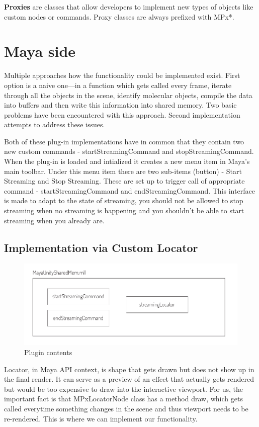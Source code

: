 \documentclass[
  digital, %
  table,   %
  nolof,     %
  nolot,     %
]{fithesis3}
\begin{document}
\textbf{Proxies} are classes that allow developers to implement new types of objects like custom nodes or commands. Proxy classes are always prefixed with MPx*.

\section{Maya side}
Multiple approaches how the functionality could be implemented exist. First option is a naive one—in a function which gets called every frame, iterate through all the objects in the scene, identify molecular objects, compile the data into buffers and then write this information into shared memory. Two basic problems have been encountered with this approach. Second implementation attempts to address these issues.

Both of these plug-in implementations have in common that they contain two new custom commands - startStreamingCommand and stopStreamingCommand. When the plug-in is loaded and intialized it creates a new menu item in Maya's main toolbar. Under this menu item there are two sub-items (button) - Start Streaming and Stop Streaming. These are set up to trigger call of appropriate command - startStreamingCommand and endStreamingCommand. This interface is made to adapt to the state of streaming, you should not be allowed to stop streaming when no streaming is happening and you shouldn't be able to start streaming when you already are.

\subsection{Implementation via Custom Locator}
\begin{figure}
  \centering
  \includegraphics[scale=0.8]{images/plugin-contents.pdf}
  \caption{Plugin contents}
  \label{fig:plugin-content}
\end{figure}
Locator, in Maya API context, is shape that gets drawn but does not show up in the final render. It can serve as a preview of an effect that actually gets rendered but would be too expensive to draw into the interactive viewport. For us, the important fact is that MPxLocatorNode class has a method draw, which gets called everytime something changes in the scene and thus viewport needs to be re-rendered. This is where we can implement our functionality.
\end{document}
